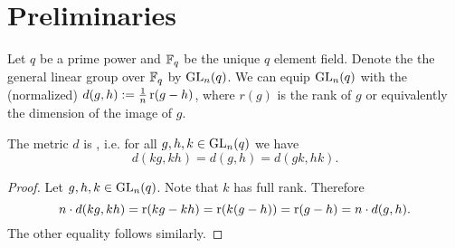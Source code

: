 








\section{Preliminaries}\label{sec:generalDefns}
Let $q$ be a prime power and $\mathbb{F}_q$ be the unique $q$ element field. Denote the the general linear group over $\mathbb{F}_q$ by $\operatorname{GL}_n(q)$. We can equip $\operatorname{GL}_n(q)$ with the (normalized)  $d(g,h):=\frac{1}{n}\operatorname{r}(g-h)$, where $r(g)$ is the rank of $g$ or equivalently the dimension of the image of $g$. 

\begin{lemma}
The metric $d$ is , i.e. for all $g,h,k\in \operatorname{GL}_n(q)$ we have 
\[d(kg,kh)=d(g,h)=d(gk,hk).\] 
\end{lemma}
\begin{proof}
Let $g,h,k\in \operatorname{GL}_n(q)$. Note that $k$ has full rank. Therefore
\[n\cdot d(kg,kh)=\operatorname{r}(kg-kh)=\operatorname{r}(k(g-h))=\operatorname{r}(g-h)=n\cdot d(g,h).\]
The other equality follows similarly.
\end{proof}


